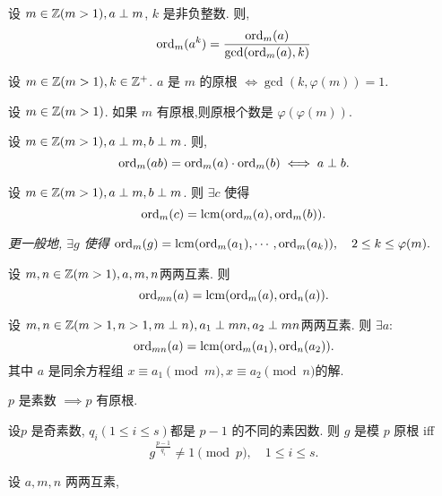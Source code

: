 \begin{theorem}
    设 $m \in \mathbb{Z}(m>1),a \perp m$, $k$ 是非负整数. 则, 
    $$\mathrm{ord}_{m}(a^k) = \frac{\mathrm{ord}_{m}(a)}{\gcd(\mathrm{ord}_{m}(a),k)}$$
\end{theorem}

\begin{theorem}
    设 $m \in \mathbb{Z}(m>1), k \in \mathbb{Z}^+$. $a$ 是 $m$ 的原根 $\iff \gcd(k,\varphi(m))=1$.
\end{theorem}

\begin{theorem}
    设 $m \in \mathbb{Z}(m>1)$. 如果 $m$ 有原根,则原根个数是 $\varphi(\varphi(m))$.
\end{theorem}

\begin{theorem}
    设 $m \in \mathbb{Z}(m>1), a \perp m, b \perp m$. 则,
    $$\mathrm{ord}_{m}(ab) = \mathrm{ord}_{m}(a) \cdot \mathrm{ord}_{m}(b) \iff a \perp b.$$
\end{theorem}

\begin{theorem}
    设 $m \in \mathbb{Z}(m>1), a \perp m, b \perp m$. 则 $\exists c$ 使得
    $$\mathrm{ord}_{m}(c) = \mathrm{lcm}(\mathrm{ord}_{m}(a),\mathrm{ord}_{m}(b)).$$
\end{theorem}

\textit{更一般地, $\exists g$ 使得 $\mathrm{ord}_{m}(g) = \mathrm{lcm}(\mathrm{ord}_{m}(a_1), \cdots, \mathrm{ord}_{m}(a_k)), \quad 2 \le k \le \varphi(m).$}

\begin{theorem}
    设 $m,n \in \mathbb{Z}(m>1), a,m,n$两两互素. 则 
    $$\mathrm{ord}_{mn}(a) = \mathrm{lcm}(\mathrm{ord}_{m}(a),\mathrm{ord}_{n}(a)).$$
\end{theorem}

\begin{theorem}
    设 $m,n \in \mathbb{Z}(m>1,n>1,m\perp n),a_1 \perp mn, a_2 \perp mn$两两互素. 则 $\exists a:$
    $$\mathrm{ord}_{mn}(a) = \mathrm{lcm}(\mathrm{ord}_{m}(a_1),\mathrm{ord}_{n}(a_2)).$$
    其中 $a$ 是同余方程组 $x \equiv a_1 \pmod{m}, x \equiv a_2 \pmod{n}$的解.
\end{theorem}

\begin{theorem}
    $p$ 是素数 $\implies p$ 有原根.
\end{theorem}

\begin{theorem}[原根判定]
    设$p$ 是奇素数, $q_i(1 \le i \le s)$都是 $p-1$ 的不同的素因数. 则 $g$ 是模 $p$ 原根 iff
    $$g^{\frac{p-1}{q_i}} \ne 1 \pmod{p}, \quad 1 \le i \le s.$$
\end{theorem}

\begin{theorem}
    设 \(a,m,n\) 两两互素, 
\end{theorem}

